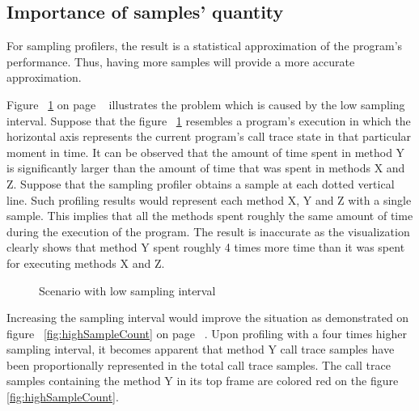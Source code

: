 \documentclass[..thesis.tex]{subfiles}
\begin{document}
\subsection{Importance of samples' quantity}

For sampling profilers, the result is a statistical approximation of the program's performance. Thus, having more samples will provide a more accurate approximation. 

Figure ~\ref{fig:lowSampleCount} on page ~\pageref{fig:lowSampleCount} illustrates the problem which is caused by the low sampling interval. Suppose that the figure ~\ref{fig:lowSampleCount} resembles a program's execution in which the horizontal axis represents the current program's call trace state in that particular moment in time. It can be observed that the amount of time spent in method Y is significantly larger than the amount of time that was spent in methods X and Z. Suppose that the sampling profiler obtains a sample at each dotted vertical line. Such profiling results would represent each method X, Y and Z with a single sample. This implies that all the methods spent roughly the same amount of time during the execution of the program. The result is inaccurate as the visualization clearly shows that method Y spent roughly 4 times more time than it was spent for executing methods X and Z.

\begin{figure}[H]
\centering
{}
\caption{Scenario with low sampling interval}
\label{fig:lowSampleCount}
\end{figure}

Increasing the sampling interval would improve the situation as demonstrated on figure ~\ref{fig:highSampleCount} on page ~\pageref{fig:highSampleCount}. Upon profiling with a four times higher sampling interval, it becomes apparent that method Y call trace samples have been proportionally represented in the total call trace samples. The call trace samples containing the method Y in its top frame are colored red on the figure \ref{fig:highSampleCount}.
\end{document}
